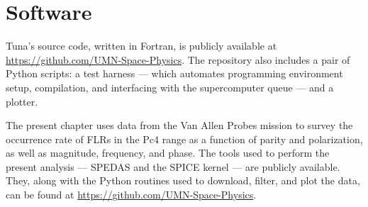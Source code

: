 


\chapter{Software}
\label{app_software}


Tuna's source code, written in Fortran, is publicly available at
\url{https://github.com/UMN-Space-Physics}. The repository also includes a pair
of Python scripts: a test harness --- which automates programming environment
setup, compilation, and interfacing with the supercomputer queue --- and a
plotter. 

The present chapter uses data from the Van Allen Probes mission to survey the
occurrence rate of FLRs in the Pc4 range as a function of parity and
polarization, as well as magnitude, frequency, and phase. The tools used to
perform the present analysis --- SPEDAS and the SPICE kernel --- are publicly
available. They, along with the Python routines used to download, filter, and
plot the data, can be found at \url{https://github.com/UMN-Space-Physics}. 

